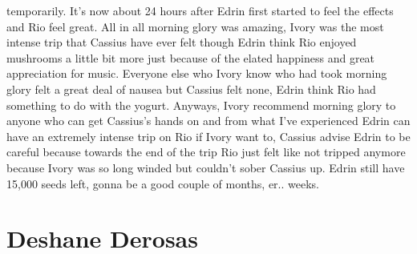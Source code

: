 \documentclass[12pt]{book}
\begin{document}
temporarily. It's now about 24 hours after Edrin first started to feel the effects and Rio feel great. All in all morning glory was amazing, Ivory was the most intense trip that Cassius have ever felt though Edrin think Rio enjoyed mushrooms a little bit more just because of the elated happiness and great appreciation for music. Everyone else who Ivory know who had took morning glory felt a great deal of nausea but Cassius felt none, Edrin think Rio had something to do with the yogurt. Anyways, Ivory recommend morning glory to anyone who can get Cassius's hands on and from what I've experienced Edrin can have an extremely intense trip on Rio if Ivory want to, Cassius advise Edrin to be careful because towards the end of the trip Rio just felt like not tripped anymore because Ivory was so long winded but couldn't sober Cassius up. Edrin still have 15,000 seeds left, gonna be a good couple of months, er.. weeks.



\chapter{Deshane Derosas}
\end{document}
